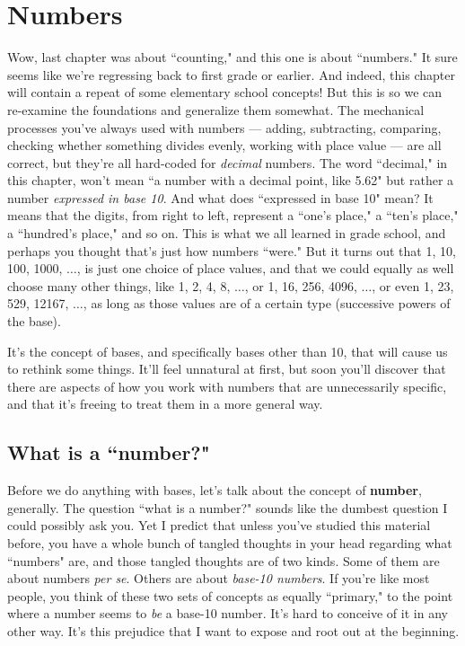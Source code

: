
\chapter{Numbers}

Wow, last chapter was about ``counting," and this one is about ``numbers."
It sure seems like we're regressing back to first grade or earlier. And
indeed, this chapter will contain a repeat of some elementary school
concepts! But this is so we can re-examine the foundations and generalize
them somewhat. The mechanical processes you've always used with numbers ---
adding, subtracting, comparing, checking whether something divides evenly,
working with place value --- are all correct, but they're all hard-coded
for \textit{decimal} numbers. The word ``decimal," in this chapter, won't
mean ``a number with a decimal point, like 5.62" but rather a number
\textit{expressed in base 10}. And what does ``expressed in base 10" mean?
It means that the digits, from right to left, represent a ``one's place," a
``ten's place," a ``hundred's place," and so on. This is what we all
learned in grade school, and perhaps you thought that's just how numbers
``were." But it turns out that 1, 10, 100, 1000, $\dots$, is just one
choice of place values, and that we could equally as well choose many other
things, like 1, 2, 4, 8, $\dots$, or 1, 16, 256, 4096, $\dots$, or even 1,
23, 529, 12167, $\dots$, as long as those values are of a certain type
(successive powers of the base).

It's the concept of bases, and specifically bases other than 10, that will
cause us to rethink some things. It'll feel unnatural at first, but soon
you'll discover that there are aspects of how you work with numbers that
are unnecessarily specific, and that it's freeing to treat them in a more
general way.

\section{What is a ``number?"}

Before we do anything with bases, let's talk about the concept of
\textbf{number}, generally. The question ``what is a number?" sounds like
the dumbest question I could possibly ask you. Yet I predict that unless
you've studied this material before, you have a whole bunch of tangled
thoughts in your head regarding what ``numbers" are, and those tangled
thoughts are of two kinds. Some of them are about numbers \textit{per se}.
Others are about \textit{base-10 numbers}. If you're like most people, you
think of these two sets of concepts as equally ``primary," to the point
where a number seems to \textit{be} a base-10 number. It's hard to conceive
of it in any other way.  It's this prejudice that I want to expose and root
out at the beginning.

